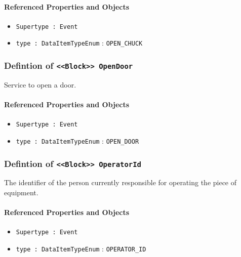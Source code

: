 \FloatBarrier
\paragraph{Referenced Properties and Objects}

\begin{itemize}
\item \texttt{Supertype : Event}

\item \texttt{type : DataItemTypeEnum} : \texttt{OPEN_CHUCK}

\end{itemize}
\FloatBarrier
\subsubsection{Defintion of \texttt{<<Block>> OpenDoor}}
  \label{type:OpenDoor}

\FloatBarrier

Service to open a door.

\FloatBarrier
\paragraph{Referenced Properties and Objects}

\begin{itemize}
\item \texttt{Supertype : Event}

\item \texttt{type : DataItemTypeEnum} : \texttt{OPEN_DOOR}

\end{itemize}
\FloatBarrier
\subsubsection{Defintion of \texttt{<<Block>> OperatorId}}
  \label{type:OperatorId}

\FloatBarrier

The identifier of the person currently responsible for operating the piece of equipment.

\FloatBarrier
\paragraph{Referenced Properties and Objects}

\begin{itemize}
\item \texttt{Supertype : Event}

\item \texttt{type : DataItemTypeEnum} : \texttt{OPERATOR_ID}

\end{itemize}
\FloatBarrier
